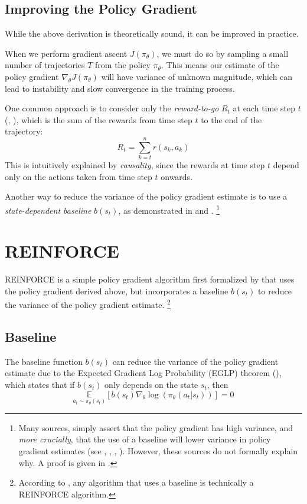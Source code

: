 \documentclass{article} %
\begin{document}
\subsection{Improving the Policy Gradient}

While the above derivation is theoretically sound, it can be improved in practice.

When we perform gradient ascent $J(\pi_\theta)$, 
we must do so by sampling a small number of trajectories $T$ from the policy $\pi_\theta$.
This means our estimate of the policy gradient $\nabla_\theta J(\pi_\theta)$ will have
variance of unknown magnitude, which can lead to instability and slow convergence in the training process. 

One common approach is to consider only the \textit{reward-to-go} $R_t$ at each time step $t$ (\cite{SpinningUp-2018}, \cite{Levine-et-al-2023}),
which is the sum of the rewards from time step $t$ to the end of the trajectory:
\begin{equation} \label{reward_to_go}
    R_t = \sum_{k=t}^{n} r(s_k, a_k)
\end{equation}
This is intuitively explained by \textit{causality}, since the rewards at time step $t$ depend only on the actions taken from time step $t$ onwards.

Another way to reduce the variance of the policy gradient estimate is to use a \textit{state-dependent baseline} $b(s_t)$,
as demonstrated in \cite{SpinningUp-2018} and \cite{Williams-1992}.
\footnote{Many sources, simply assert that the policy gradient has high variance, 
and \textit{more crucially}, that the use of a baseline will lower variance in policy gradient estimates 
(see \cite{Weng-2018}, \cite{SpinningUp-2018}, \cite{Takeshi-2017}, \cite{Sutton-and-Barto-1998}).
However, these sources do not formally explain why. A proof is given in \cite{Wu-et-al-2018}.
}

\section{REINFORCE}
REINFORCE is a simple policy gradient algorithm first formalized by \cite{Williams-1992} that uses the policy gradient derived above,
but incorporates a baseline $b(s_t)$ to reduce the variance of the policy gradient estimate. \footnote{
    According to \cite{Williams-1992}, any algorithm that uses a baseline is technically a REINFORCE algorithm.
}

\subsection{Baseline}
The baseline function $b(s_t)$ can reduce the variance of the policy gradient estimate
due to the Expected Gradient Log Probability (EGLP) theorem (\cite{SpinningUp-2018}), which states that
if $b(s_t)$ only depends on the state $s_t$, then
\begin{equation} \label{eglp}
    \underset{a_t \sim \pi_\theta(s_t)}{\mathbb{E}} \left[ b(s_t)\nabla_\theta \log(\pi_\theta(a_t | s_t)) \right] = 0
\end{equation}
\end{document}
